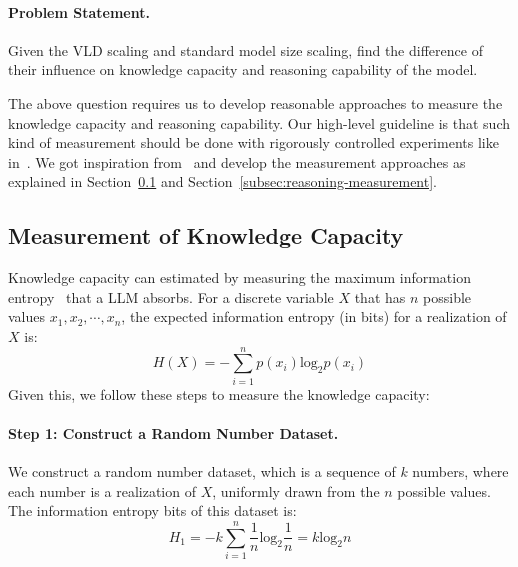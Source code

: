 \documentclass{article} %
\begin{document}

\paragraph{Problem Statement.} Given the VLD scaling and standard model size scaling, find the difference of their influence on knowledge capacity and reasoning capability of the model.

The above question requires us to develop reasonable approaches to measure the knowledge capacity and reasoning capability. Our high-level guideline is that such kind of measurement should be done with rigorously controlled experiments like in~\citep{allen2024physics}. We got inspiration from~\citep{allen2024physics} and develop the measurement approaches as explained in Section~\ref{subsec:knowledge-capacity-measurement} and Section~\ref{subsec:reasoning-measurement}.


\subsection{Measurement of Knowledge Capacity} \label{subsec:knowledge-capacity-measurement}


Knowledge capacity can estimated by measuring the maximum information entropy~\citep{gray2011entropy, volkenstein2009entropy} that a LLM absorbs. For a discrete variable $X$ that has $n$ possible values $x_1, x_2, \cdots, x_n$, the expected information entropy (in bits) for a realization of $X$ is:
\[
H(X) = -\sum_{i=1}^n p(x_i) \mathrm{log_2}p(x_i)
\]
Given this, we follow these steps to measure the knowledge capacity:
\paragraph{Step 1: Construct a Random Number Dataset.} We construct a random number dataset, which is a sequence of $k$ numbers, where each number is a realization of $X$, uniformly drawn from the $n$ possible values. The information entropy bits of this dataset is:
\[
H_1 = -k\sum_{i=1}^n \frac{1}{n} \mathrm{log_2}\frac{1}{n} = k\mathrm{log_2}n
\]
\end{document}
